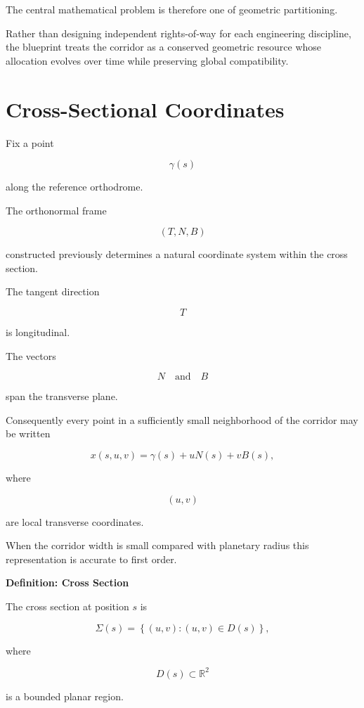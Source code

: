 \documentclass[11pt,fleqn]{book}
\numberwithin{equation}{chapter}
\newenvironment{definition}[1]
  {\begin{definitionEnv}
   \noindent\textbf{Definition: #1}\par\smallskip}
  {\end{definitionEnv}}
\theoremstyle{plain}
\theoremstyle{definition}
\theoremstyle{remark}
\begin{document}
The central mathematical problem is therefore one of geometric
partitioning.

Rather than designing independent rights-of-way for each engineering
discipline, the blueprint treats the corridor as a conserved geometric
resource whose allocation evolves over time while preserving global
compatibility.


\section{Cross-Sectional Coordinates}

Fix a point

\[
\gamma(s)
\]

along the reference orthodrome.

The orthonormal frame

\[
(T,N,B)
\]

constructed previously determines a natural coordinate system within the
cross section.

The tangent direction

\[
T
\]

is longitudinal.

The vectors

\[
N
\quad\text{and}\quad
B
\]

span the transverse plane.

Consequently every point in a sufficiently small neighborhood of the
corridor may be written

\[
x(s,u,v)
=
\gamma(s)
+
uN(s)
+
vB(s),
\]

where

\[
(u,v)
\]

are local transverse coordinates.

When the corridor width is small compared with planetary radius this
representation is accurate to first order.


\begin{definition}{Cross Section}

The cross section at position $s$ is

\[
\Sigma(s)
=
\left\{
(u,v):
(u,v)
\in
D(s)
\right\},
\]

where

\[
D(s)
\subset\mathbb R^2
\]

is a bounded planar region.

\end{definition}
\end{document}
